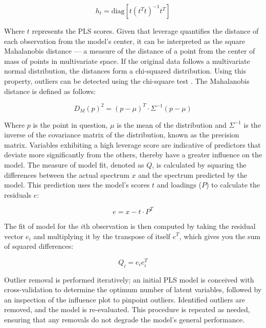 \begin{equation}
    h_t = \text{diag}\left[ t(t^T t)^{-1} t^T \right]
\end{equation}

Where $t$ represents the PLS scores.
Given that leverage quantifies the distance of each observation from the model's center, it can be interpreted as the square Mahalanobis distance — a measure of the distance of a point from the center of mass of points in multivariate space. 
If the original data follows a multivariate normal distribution, the distances form a chi-squared distribution. Using this property, outliers can be detected using the chi-square test \cite{brereton_chi_2015}.
The Mahalanobis distance is defined as follows:

\begin{equation}
    D_M(p)^2 = (p - \mu)^T \cdot \Sigma^{-1} (p - \mu)
\end{equation}

Where $p$ is the point in question, $\mu$ is the mean of the distribution and $\Sigma^{-1}$ is the inverse of the covariance matrix of the distribution, known as the precision matrix. 
Variables exhibiting a high leverage score are indicative of predictors that deviate more significantly from the others, thereby have a greater influence on the model.
The measure of model fit, denoted as $Q$, is calculated by squaring the differences between the actual spectrum $x$ and the spectrum predicted by the model. This prediction uses the model's scores $t$ and loadings ($P$) to calculate the residuals $e$:

\begin{equation}
    e = x - t \cdot P^T
\end{equation}

The fit of model for the $i$th observation is then computed by taking the residual vector $e_i$ and multiplying it by the transpose of itself $e^T$, which gives you the sum of squared differences: 

\begin{equation}
    Q_i = e_{i}e_{i}^T
\end{equation} \cite{marini_chemometrics_2013} \citet{andersonImprovedAccuracyQuantitative2017}

Outlier removal is performed iteratively; an initial PLS model is conceived with cross-validation to determine the optimum number of latent variables, followed by an inspection of the influence plot to pinpoint outliers. Identified outliers are removed, and the model is re-evaluated. This procedure is repeated as needed, ensuring that any removals do not degrade the model's general performance.


